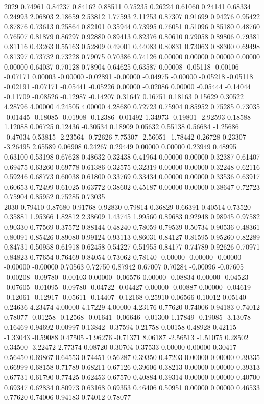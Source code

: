 {2029 0.74961 0.84237 0.84162 0.88511 0.75235 0.26224 0.61060 0.24141 0.68334 0.24993 2.06803 2.18659 2.53812 1.77593 2.11253 0.87307 0.91699 0.94276 0.95422 0.87876 0.73613 0.25864 0.82101 0.35944 0.73995 0.76051 0.51096 0.85180 0.48760 0.76507 0.81879 0.86297 0.92880 0.89413 0.82376 0.80610 0.79058 0.89806 0.79381 0.81116 0.43263 0.55163 0.52809 0.49001 0.44083 0.80831 0.73063 0.88300 0.69498 0.81397 0.73732 0.73228 0.79075 0.70386 0.74126 0.00000 0.00000 0.00000 0.00000 0.00000 0.64037 0.70128 0.78904 0.64625 0.63587 0.00008 -0.05118 -0.00106 -0.07171 0.00003 -0.00000 -0.02891 -0.00000 -0.04975 -0.00000 -0.05218 -0.05118 -0.02191 -0.07171 -0.05441 -0.05226 0.00000 -0.02086 0.00000 -0.05444 -0.14044 -0.11709 -0.08526 -0.12987 -0.14207 0.31647 0.16751 0.18163 0.15629 0.30522 4.28796 4.00000 4.24505 4.00000 4.28680 0.72723 0.75904 0.85952 0.75285 0.73035 -0.01445 -0.18085 -0.01908 -0.12386 -0.01492 1.34973 -0.19801 -2.92593 0.18588 1.12088 0.06725 0.12436 -0.30534 0.18909 0.05632 0.55138 0.56684 -1.25686 -0.47034 0.53815 -2.23564 -0.72626 7.75307 -2.56051 -1.78442 0.26728 0.23307 -3.26495 2.65589 0.06908 0.24267 0.29449 0.00000 0.00000 0.23949 0.48995 0.63100 0.53198 0.67628 0.48632 0.32438 0.41964 0.00000 0.00000 0.32387 0.61407 0.69475 0.63260 0.69778 0.61386 0.32575 0.32319 0.00000 0.00000 0.32248 0.62116 0.59246 0.68773 0.60038 0.61800 0.33769 0.33434 0.00000 0.00000 0.33536 0.63917 0.60653 0.72499 0.61025 0.63772 0.38602 0.45187 0.00000 0.00000 0.38647 0.72723 0.75904 0.85952 0.75285 0.73035 \\
2030 0.79410 0.87680 0.91768 0.92830 0.79814 0.36829 0.66391 0.40514 0.73520 0.35881 1.95366 1.82812 2.38609 1.43745 1.99560 0.89683 0.92948 0.98945 0.97582 0.90330 0.77569 0.37572 0.88144 0.48240 0.78059 0.79539 0.50734 0.90536 0.48361 0.80091 0.85426 0.89080 0.99124 0.93113 0.86031 0.84127 0.81595 0.95260 0.82289 0.84731 0.50958 0.61918 0.62458 0.54227 0.51955 0.84177 0.74789 0.92626 0.70971 0.84823 0.77654 0.76469 0.84054 0.73062 0.78140 -0.00000 -0.00000 -0.00000 -0.00000 -0.00000 0.70563 0.72750 0.87942 0.67007 0.70284 -0.00096 -0.07605 -0.00208 -0.09780 -0.00103 0.00000 -0.06576 0.00000 -0.08834 0.00000 -0.04523 -0.07605 -0.01095 -0.09780 -0.04722 -0.04427 0.00000 -0.00887 0.00000 -0.04619 -0.12061 -0.12917 -0.05611 -0.14407 -0.12168 0.25910 0.06566 0.10012 0.05140 0.24636 4.23474 4.00000 4.17229 4.00000 4.23176 0.77620 0.74006 0.94183 0.74012 0.78077 -0.01258 -0.12568 -0.01641 -0.06646 -0.01300 1.17849 -0.19085 -3.13078 0.16469 0.94692 0.00997 0.13842 -0.37594 0.21758 0.00158 0.48928 0.42115 -1.33043 -0.59088 0.47505 -1.96276 -0.71371 8.06187 -2.56513 -1.51075 0.28502 0.34500 -3.22472 2.77374 0.08720 0.30704 0.37533 0.00000 0.00000 0.30417 0.56450 0.69867 0.64553 0.74451 0.56287 0.39350 0.47203 0.00000 0.00000 0.39335 0.66999 0.68158 0.71789 0.68211 0.67126 0.39606 0.38213 0.00000 0.00000 0.39313 0.67731 0.61790 0.77425 0.62453 0.67570 0.40884 0.39314 0.00000 0.00000 0.40700 0.69347 0.62834 0.80973 0.63168 0.69353 0.46406 0.50951 0.00000 0.00000 0.46533 0.77620 0.74006 0.94183 0.74012 0.78077 \\
}
